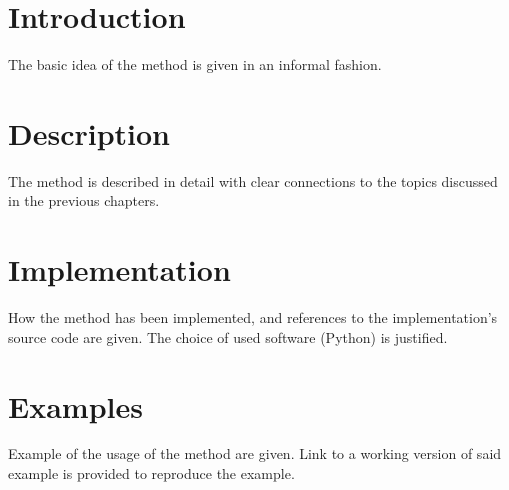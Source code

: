 \section{Introduction}
{\color{red}
The basic idea of the method is given in an informal fashion.
}

\section{Description}
{\color{red}
The method is described in detail with clear connections to the topics discussed in the previous chapters.
}

\section{Implementation}
{\color{red}
How the method has been implemented, and references to the implementation's source code are given.
The choice of used software (Python) is justified.
}

\section{Examples}
{\color{red}
Example of the usage of the method are given. Link to a working version of said example is provided to reproduce the example.
}